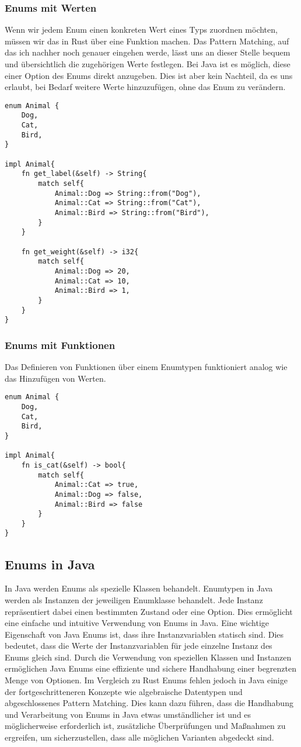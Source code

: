 \documentclass[a4paper, 1ppt]{article}
\begin{document}
\subsubsection{Enums mit Werten}
Wenn wir jedem Enum einen konkreten Wert eines Typs zuordnen möchten, müssen wir das in Rust über eine Funktion machen.
Das Pattern Matching, auf das ich nachher noch genauer eingehen werde, lässt uns an dieser Stelle bequem und übersichtlich die zugehörigen Werte festlegen.
Bei Java ist es möglich, diese einer Option des Enums direkt anzugeben. Dies ist aber kein Nachteil, da es uns erlaubt, bei Bedarf weitere Werte hinzuzufügen, ohne das Enum zu verändern.
\begin{verbatim}
enum Animal {
    Dog,
    Cat,
    Bird,
}

impl Animal{
    fn get_label(&self) -> String{
        match self{
            Animal::Dog => String::from("Dog"),
            Animal::Cat => String::from("Cat"),
            Animal::Bird => String::from("Bird"),
        }
    }

    fn get_weight(&self) -> i32{
        match self{
            Animal::Dog => 20,
            Animal::Cat => 10,
            Animal::Bird => 1,
        }
    }
}

\end{verbatim}
\newpage
\subsubsection{Enums mit Funktionen}
Das Definieren von Funktionen über einem Enumtypen funktioniert analog wie das Hinzufügen von Werten.
\begin{verbatim}
enum Animal {
    Dog,
    Cat,
    Bird,
}

impl Animal{
    fn is_cat(&self) -> bool{
        match self{
            Animal::Cat => true,
            Animal::Dog => false,
            Animal::Bird => false
        }
    }
}
\end{verbatim}
\subsection{Enums in Java}
In Java werden Enums als spezielle Klassen behandelt.
Enumtypen in Java werden als Instanzen der jeweiligen Enumklasse behandelt. Jede Instanz repräsentiert dabei einen bestimmten Zustand oder eine Option. Dies ermöglicht eine einfache und intuitive Verwendung von Enums in Java.
Eine wichtige Eigenschaft von Java Enums ist, dass ihre Instanzvariablen statisch sind. Dies bedeutet, dass die Werte der Instanzvariablen für jede einzelne Instanz des Enums gleich sind. 
Durch die Verwendung von speziellen Klassen und Instanzen ermöglichen Java Enums eine effiziente und sichere Handhabung einer begrenzten Menge von Optionen. 
Im Vergleich zu Rust Enums fehlen jedoch in Java einige der fortgeschritteneren Konzepte wie algebraische Datentypen und abgeschlossenes Pattern Matching. Dies kann dazu führen, dass die Handhabung und Verarbeitung von Enums in Java etwas umständlicher ist und es möglicherweise erforderlich ist, zusätzliche Überprüfungen und Maßnahmen zu ergreifen, um sicherzustellen, dass alle möglichen Varianten abgedeckt sind.
\end{document}
